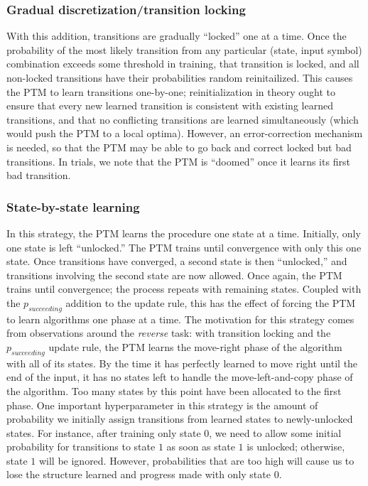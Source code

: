\documentclass{article}
\begin{document}
\subsubsection{Gradual discretization/transition locking}
With this addition, transitions are gradually ``locked'' one at a time. Once the probability of the most likely transition from any particular (state, input symbol) combination exceeds some threshold in training, that transition is locked, and all non-locked transitions have their probabilities random reinitailized. This causes the PTM to learn transitions one-by-one; reinitialization in theory ought to ensure that every new learned transition is consistent with existing learned transitions, and that no conflicting transitions are learned simultaneously (which would push the PTM to a local optima). However, an error-correction mechanism is needed, so that the PTM may be able to go back and correct locked but bad transitions. In trials, we note that the PTM is ``doomed'' once it learns its first bad transition.

\subsubsection{State-by-state learning}
In this strategy, the PTM learns the procedure one state at a time. Initially, only one state is left ``unlocked.'' The PTM trains until convergence with only this one state. Once transitions have converged, a second state is then ``unlocked,'' and transitions involving the second state are now allowed. Once again, the PTM trains until convergence; the process repeats with remaining states. Coupled with the $p_{succeeding}$ addition to the update rule, this has the effect of forcing the PTM to learn algorithms one phase at a time. 
The motivation for this strategy comes from observations around the \textit{reverse} task: with transition locking and the $p_{succeeding}$ update rule, the PTM learns the move-right phase of the algorithm with all of its states. By the time it has perfectly learned to move right until the end of the input, it has no states left to handle the move-left-and-copy phase of the algorithm. Too many states by this point have been allocated to the first phase.
One important hyperparameter in this strategy is the amount of probability we initially assign transitions from learned states to newly-unlocked states. For instance, after training only state $0$, we need to allow some initial probability for transitions to state $1$ as soon as state $1$ is unlocked; otherwise, state $1$ will be ignored. However, probabilities that are too high will cause us to lose the structure learned and progress made with only state $0$.  
\end{document}
